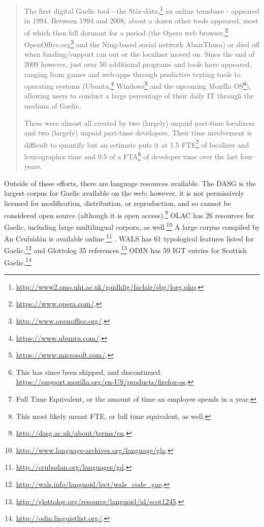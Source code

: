 \begin{quote}
  The first digital Gaelic tool - the St\`{o}r-d\`{a}ta,\footnote{\href{http://www2.smo.uhi.ac.uk/gaidhlig/faclair/sbg/lorg.php}{http://www2.smo.uhi.ac.uk/gaidhlig/faclair/sbg/lorg.php}. } an online termbase - appeared in 1994. Between 1994 and 2008, about a dozen other tools appeared, most of which then fell dormant for a period (the Opera web browser,\footnote{\href{https://www.opera.com/}{https://www.opera.com/}. } OpenOffice.org\footnote{\href{http://www.openoffice.org/}{http://www.openoffice.org/}. } and the Ning-based social network AbairThusa) or died off when funding/support ran out or the localizer moved on. Since the end of 2009 however, just over 50 additional programs and tools have appeared, ranging from games and web-apps through predictive texting tools to operating systems (Ubuntu,\footnote{\href{https://www.ubuntu.com/}{https://www.ubuntu.com/}. } Windows\footnote{\href{https://www.microsoft.com/}{https://www.microsoft.com/}. } and the upcoming Mozilla OS\footnote{This has since been shipped, and discontinued. \href{https://support.mozilla.org/en-US/products/firefox-os}{https://support.mozilla.org/en-US/products/firefox-os}. }), allowing users to conduct a large percentage of their daily IT through the medium of Gaelic.

  These were almost all created by two (largely) unpaid part-time localizers and two (largely) unpaid part-time developers. Their time involvement is difficult to quantify but an estimate puts it at 1.5 FTE\footnote{Full Time Equivalent, or the amount of time an employee spends in a year.} of localizer and lexicographer time and 0.5 of a FTA\footnote{This most likely meant FTE, or full time equivalent, as well.} of developer time over the last four years.
\end{quote}

Outside of these efforts, there are language resources available. The DASG is the largest corpus for Gaelic available on the web; however, it is not permissively licensed for modification, distribution, or reproduction, and so cannot be considered open source (although it is open access).\footnote{\href{http://dasg.ac.uk/about/terms/en}{http://dasg.ac.uk/about/terms/en}. } OLAC has 26 resources for Gaelic, including large multilingual corpora, as well.\footnote{\href{http://www.language-archives.org/language/gla}{http://www.language-archives.org/language/gla}. } A large corpus compiled by An Crub\'ad\'an is available online \footnote{\href{http://crubadan.org/languages/gd}{http://crubadan.org/languages/gd}. } \citep{scannell2007crubadan}. WALS has 61 typological features listed for Gaelic,\footnote{\href{http://wals.info/languoid/lect/wals_code_gae}{http://wals.info/languoid/lect/wals\_code\_gae}. } and Glottolog 35 references.\footnote{\href{http://glottolog.org/resource/languoid/id/scot1245}{http://glottolog.org/resource/languoid/id/scot1245}. } ODIN has 59 IGT entries for Scottish Gaelic.\footnote{\href{http://odin.linguistlist.org/}{http://odin.linguistlist.org/}. }

